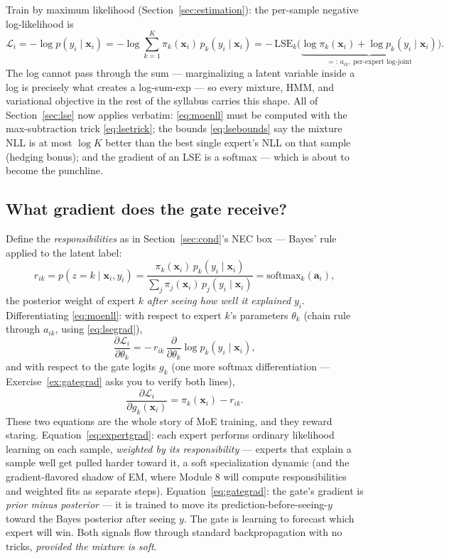 \documentclass[11pt]{article}
\numberwithin{equation}{section}
\theoremstyle{plain}
\theoremstyle{definition}
\theoremstyle{remark}
\newcommand{\x}{\bm{x}}
\begin{document}
Train by maximum likelihood (Section~\ref{sec:estimation}): the per-sample negative log-likelihood is
\begin{equation}
\mathcal{L}_i
= -\log p(y_i \mid \x_i)
= -\log \sum_{k=1}^{K} \pi_k(\x_i)\, p_k(y_i \mid \x_i)
= -\,\mathrm{LSE}_k\Big( \underbrace{\log \pi_k(\x_i) + \log p_k(y_i \mid \x_i)}_{=:\, a_{ik},\ \text{per-expert log-joint}} \Big).
\label{eq:moenll}
\end{equation}
The log cannot pass through the sum --- marginalizing a latent variable inside a log is precisely what creates a log-sum-exp --- so every mixture, HMM, and variational objective in the rest of the syllabus carries this shape. All of Section~\ref{sec:lse} now applies verbatim: \eqref{eq:moenll} must be computed with the max-subtraction trick \eqref{eq:lsetrick}; the bounds \eqref{eq:lsebounds} say the mixture NLL is at most $\log K$ better than the best single expert's NLL on that sample (hedging bonus); and the gradient of an LSE is a softmax --- which is about to become the punchline.

\subsection{What gradient does the gate receive?}

Define the \emph{responsibilities} as in Section~\ref{sec:cond}'s NEC box --- Bayes' rule applied to the latent label:
\begin{equation}
r_{ik} = p(z = k \mid \x_i, y_i)
= \frac{\pi_k(\x_i)\, p_k(y_i \mid \x_i)}{\sum_j \pi_j(\x_i)\, p_j(y_i \mid \x_i)}
= \mathrm{softmax}_k(\bm{a}_i),
\end{equation}
the posterior weight of expert $k$ \emph{after seeing how well it explained} $y_i$. Differentiating \eqref{eq:moenll}: with respect to expert $k$'s parameters $\theta_k$ (chain rule through $a_{ik}$, using \eqref{eq:lsegrad}),
\begin{equation}
\frac{\partial \mathcal{L}_i}{\partial \theta_k}
= -\, r_{ik} \, \frac{\partial}{\partial \theta_k} \log p_k(y_i \mid \x_i),
\label{eq:expertgrad}
\end{equation}
and with respect to the gate logits $g_k$ (one more softmax differentiation --- Exercise~\ref{ex:gategrad} asks you to verify both lines),
\begin{equation}
\frac{\partial \mathcal{L}_i}{\partial g_k(\x_i)}
= \pi_k(\x_i) - r_{ik} .
\label{eq:gategrad}
\end{equation}
These two equations are the whole story of MoE training, and they reward staring. Equation~\eqref{eq:expertgrad}: each expert performs ordinary likelihood learning on each sample, \emph{weighted by its responsibility} --- experts that explain a sample well get pulled harder toward it, a soft specialization dynamic (and the gradient-flavored shadow of EM, where Module 8 will compute responsibilities and weighted fits as separate steps). Equation~\eqref{eq:gategrad}: the gate's gradient is \emph{prior minus posterior} --- it is trained to move its prediction-before-seeing-$y$ toward the Bayes posterior after seeing $y$. The gate is learning to forecast which expert will win. Both signals flow through standard backpropagation with no tricks, \emph{provided the mixture is soft}.
\end{document}
